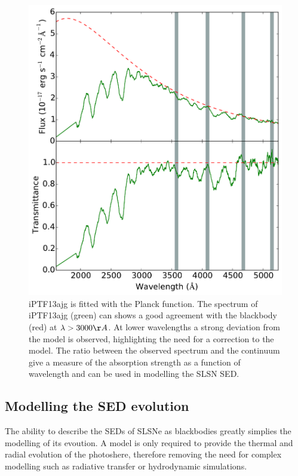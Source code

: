 \begin{figure}
\centering
\includegraphics[width=\textwidth]{Figures/Chapter4/specTemplate}
\caption{iPTF13ajg is fitted with the Planck function. The spectrum of iPTF13ajg (green) can shows a good agreement with the blackbody (red) at $\lambda>3000\AA$. At lower wavelengths a strong deviation from the model is observed, highlighting the need for a correction to the model. The ratio between the observed spectrum and the continuum give a measure of the absorption strength as a function of wavelength and can be used in modelling the SLSN SED.}
\label{fig:specTemplate}
\end{figure}

\subsection{Modelling the SED evolution}
The ability to describe the SEDs of SLSNe as blackbodies greatly simplies the
modelling of its evoution. A model is only required to provide the thermal and radial evolution of the photoshere, therefore removing the need for complex modelling such as radiative transfer or hydrodynamic simulations.

